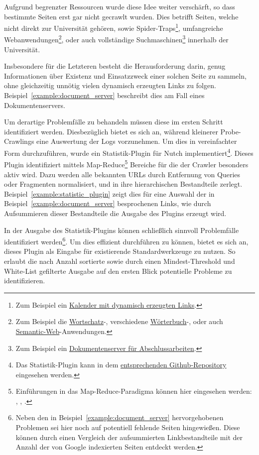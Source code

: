 Aufgrund begrenzter Ressourcen wurde diese Idee weiter verschärft,
so dass bestimmte Seiten erst gar nicht gecrawlt wurden.
Dies betrifft Seiten, welche nicht direkt zur Universität gehören,
sowie Spider-Traps\footnote{Zum Beispiel ein
\href{http://www.informatik.uni-leipzig.de/~meyer/?d=15}{Kalender mit dynamisch erzeugten Links}.},
umfangreiche Webanwendungen\footnote{Zum Beispiel die 
\href{http://wortschatz.uni-leipzig.de/de}{Wortschatz}-, verschiedene 
\href{http://www.informatik.uni-leipzig.de/~duc/TD/td/index.php?bpos=72&db=ev}{Wörterbuch}-, oder auch
\href{http://pcai003.informatik.uni-leipzig.de/kosemnet/}{Semantic-Web}-Anwendungen.},
oder auch vollständige Suchmaschinen\footnote{Zum Beispiel ein
\href{http://lips.informatik.uni-leipzig.de/}{Dokumentenserver für Abschlussarbeiten}.} innerhalb der Universität.

Insbesondere für die Letzteren besteht die Herausforderung darin,
genug Informationen über Existenz und Einsatzzweck einer solchen Seite zu sammeln,
ohne gleichzeitig unnötig vielen dynamisch erzeugten Links zu folgen.
Beispiel~\ref{example:document_server} beschreibt dies am Fall eines Dokumentenservers.



Um derartige Problemfälle zu behandeln müssen diese im ersten Schritt identifiziert werden.
Diesbezüglich bietet es sich an, während kleinerer Probe-Crawlings eine Auswertung der Logs vorzunehmen.
Um dies in vereinfachter Form durchzuführen,
wurde ein Statistik-Plugin für Nutch implementiert\footnote{Das Statistik-Plugin kann in dem
\href{https://github.com/DaniloMorgado/url_statistic_plugin}{entsprechenden Github-Repository} eingesehen werden.}.
Dieses Plugin identifiziert mittels
Map-Reduce\footnote{Einführungen in das Map-Reduce-Paradigma können hier eingesehen werden: \cite{wiki.mapreduce},
\cite{nosql.mapreduce}, \cite{hadoop.mapreduce}.}
Bereiche für die der Crawler besonders aktiv wird.
Dazu werden alle bekannten URLs durch Entfernung
von Queries oder Fragmenten normalisiert, und in ihre hierarchischen Bestandteile zerlegt.
Beispiel~\ref{example:statistic_plugin} zeigt dies für eine Auswahl der in
Beispiel~\ref{example:document_server} besprochenen Links,
wie durch Aufsummieren dieser Bestandteile die Ausgabe des Plugins erzeugt wird.



In der Ausgabe des Statistik-Plugins können schließlich sinnvoll Problemfälle identifiziert
werden\footnote{Neben den in Beispiel~\ref{example:document_server} hervorgehobenen Problemen sei hier noch auf potentiell fehlende Seiten hingewießen.
Diese können durch einen Vergleich der aufsummierten Linkbestandteile mit der Anzahl der von Google indexierten Seiten entdeckt werden.}.
Um dies effizient durchführen zu können,
bietet es sich an, dieses Plugin als Eingabe für existierende Standardwerkzeuge zu nutzen.
So erlaubt die nach Anzahl sortierte sowie durch einen Mindest-Threshold und White-List gefilterte Ausgabe
auf den ersten Blick potentielle Probleme zu identifizieren.

